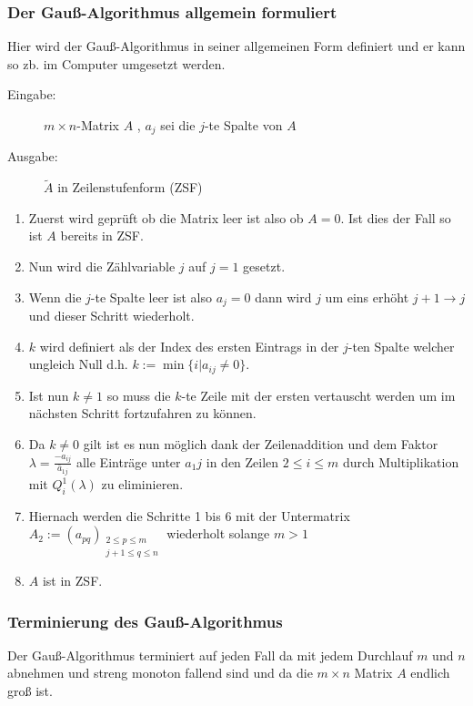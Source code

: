 \subsubsection{Der Gauß-Algorithmus allgemein formuliert}
\begin{Algo}
	Hier wird der Gauß-Algorithmus in seiner allgemeinen Form definiert und er kann so zb. im Computer umgesetzt werden.
	\begin{description}
		\item[Eingabe:] $m \times n $-Matrix $A$ , $a_j$ sei die $j$-te Spalte von $A$
		\item[Ausgabe:] $\tilde{A}$ in Zeilenstufenform (ZSF)
	\end{description}
	
	\begin{enumerate}
		\item Zuerst wird geprüft ob die Matrix leer ist also ob $A=0$. Ist dies der Fall so ist $A$ bereits in ZSF.
		\item Nun wird die Zählvariable $j$ auf $j=1$ gesetzt.
		\item Wenn die $j$-te Spalte leer ist also $a_j=0$ dann wird $j$ um eins erhöht $j+1\rightarrow j$ und dieser Schritt wiederholt.
		\item $k$ wird definiert als der Index des ersten Eintrags in der $j$-ten Spalte welcher ungleich Null d.h. $k:=\min\{i|a_{ij}\neq0\}$.
		\item Ist nun $k\neq1$ so muss die $k$-te Zeile mit der ersten vertauscht werden um im nächsten Schritt fortzufahren zu können.
		\item Da $k\neq0$ gilt ist es nun möglich dank der Zeilenaddition und dem Faktor $\lambda=\frac{-a_{ij}}{\bar{a}_{1j}}$ alle Einträge unter $a_1j$ in den Zeilen $2\leq{i}\leq{m}$ durch Multiplikation mit $Q_i^1(\lambda)$ zu eliminieren.
		\item Hiernach werden die Schritte 1 bis 6 mit der Untermatrix $A_2:=(a_{pq})_{\substack{2\leq p\leq m\\ j+1 \leq q \leq n}}$ wiederholt solange $m>1$
		\item $A$ ist in ZSF. 
	\end{enumerate}
\end{Algo}
\subsubsection{Terminierung des Gauß-Algorithmus}
	Der Gauß-Algorithmus terminiert auf jeden Fall da mit jedem Durchlauf $m$ und $n$ abnehmen und streng monoton fallend sind und da die $m \times n$ Matrix $A$ endlich groß ist. 
